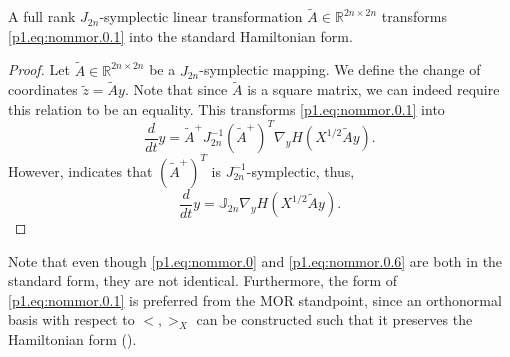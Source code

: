 \begin{lemma} \label{thm:2.1}
A full rank $J_{2n}$-symplectic linear transformation $\tilde A \in \mathbb R^{2n\times 2n}$ transforms \eqref{p1.eq:nommor.0.1} into the standard Hamiltonian form. 
\end{lemma}

\begin{proof}
Let $\tilde A\in \mathbb R^{2n\times 2n}$ be a $J_{2n}$-symplectic mapping. We define the change of coordinates $\tilde z = \tilde Ay$. Note that since $\tilde A$ is a square matrix, we can indeed require this relation to be an equality. This transforms \eqref{p1.eq:nommor.0.1} into
\begin{equation} \label{p1.eq:nommor.0.5}
	\frac{d}{dt} y = \tilde A^+ J_{2n}^{-1} (\tilde A^+)^T \nabla_y H(X^{1/2}\tilde Ay).
\end{equation}
However,  indicates that $(\tilde A^+)^T$ is $J_{2n}^{-1}$-symplectic, thus,
\begin{equation} \label{p1.eq:nommor.0.6}
	\frac{d}{dt} y = \mathbb J_{2n} \nabla_y H(X^{1/2}\tilde Ay).
\end{equation}
\end{proof}
Note that even though \eqref{p1.eq:nommor.0} and \eqref{p1.eq:nommor.0.6} are both in the standard form, they are not identical. Furthermore, the form of \eqref{p1.eq:nommor.0.1} is preferred from the MOR standpoint, since an orthonormal basis with respect to $<,>_X$ can be constructed such that it preserves the Hamiltonian form (). 

